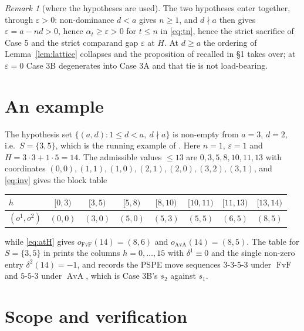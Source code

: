 \documentclass[11pt]{amsart}
\theoremstyle{definition}
\theoremstyle{remark}
\newtheorem*{remark}{Remark}
\DeclareMathOperator{\FvF}{FvF}
\DeclareMathOperator{\AvA}{AvA}
\begin{document}
\begin{remark}[where the hypotheses are used]
The two hypotheses enter together, through $\varepsilon>0$: non-dominance
$d<a$ gives $n\ge1$, and $d\nmid a$ then gives $\varepsilon=a-nd>0$, hence
$\alpha_t\ge\varepsilon>0$ for $t\le n$ in \eqref{eq:tn}, hence the strict
sacrifice of Case 5 and the strict comparand gap $\varepsilon$ at $H$. At
$d\ge a$ the ordering of Lemma~\ref{lem:lattice} collapses and the proposition
of \cite{BKLM} recalled in \S1 takes over; at $\varepsilon=0$ Case 3B
degenerates into Case 3A and that tie is not load-bearing.
\end{remark}

\section{An example}

The hypothesis set $\{(a,d):1\le d<a,\ d\nmid a\}$ is non-empty from $a=3$,
$d=2$, i.e.\ $S=\{3,5\}$, which is the running example of \cite{BKLM}. Here
$n=1$, $\varepsilon=1$ and $H=3\cdot3+1\cdot5=14$. The admissible values
$\le13$ are $0,3,5,8,10,11,13$ with coordinates
$(0,0),(1,1),(1,0),(2,1),(2,0),(3,2),(3,1)$, and \eqref{eq:inv} gives the
block table

\begin{center}
\begin{tabular}{l|ccccccc}
$h$ & $[0,3)$ & $[3,5)$ & $[5,8)$ & $[8,10)$ & $[10,11)$ & $[11,13)$ & $[13,14)$\\
\hline
$(o^1,o^2)$ & $(0,0)$ & $(3,0)$ & $(5,0)$ & $(5,3)$ & $(5,5)$ & $(6,5)$ & $(8,5)$
\end{tabular}
\end{center}

\noindent
while \eqref{eq:atH} gives $o_{\FvF}(14)=(8,6)$ and $o_{\AvA}(14)=(8,5)$. The
table for $S=\{3,5\}$ in \cite{BKLM} prints the columns $h=0,\dots,15$ with
$\delta^1\equiv0$ and the single non-zero entry $\delta^2(14)=-1$, and records
the PSPE move sequences $3\text{-}3\text{-}5\text{-}3$ under $\FvF$ and
$5\text{-}5\text{-}3$ under $\AvA$, which is Case 3B's $s_2$ against $s_1$.

\section{Scope and verification}
\end{document}
